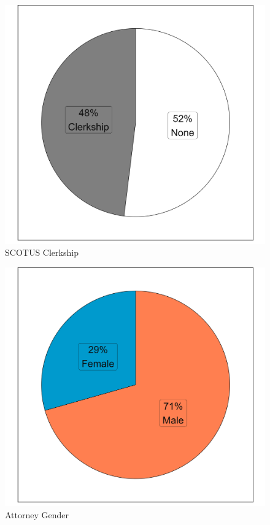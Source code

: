 \begin{landscape}
\centering
\vspace*{\fill}

\begin{multicols}{3}

    \begin{figure}[H]
        \centering
        \caption{SCOTUS Clerkship}
        \vspace{2.5mm}
        \includegraphics[width=\linewidth]{Figures/statpack_figures/percentage_scotus_clerkship.png}
    \end{figure}

    \begin{figure}[H]
        \centering
        \caption{Attorney Gender}
        \vspace{2.5mm}
        \includegraphics[width=\linewidth]{Figures/statpack_figures/percentage_gender.png}


\end{figure}
\end{multicols}
\end{landscape}
